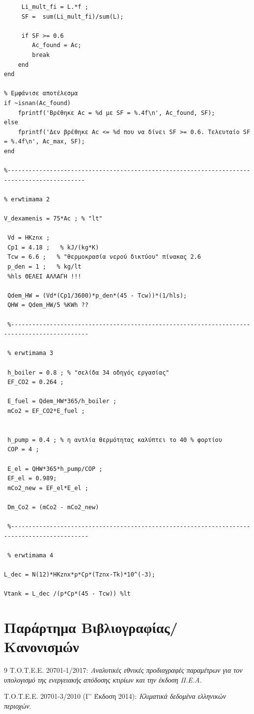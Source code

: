 \documentclass[10pt,a4paper]{article}
\begin{document}
\begin{lstlisting}
     Li_mult_fi = L.*f ;
     SF =  sum(Li_mult_fi)/sum(L);
     
     if SF >= 0.6
        Ac_found = Ac;
        break
    end
end

% Εμφάνισε αποτέλεσμα
if ~isnan(Ac_found)
    fprintf('Βρέθηκε Ac = %d με SF = %.4f\n', Ac_found, SF);
else
    fprintf('Δεν βρέθηκε Ac <= %d που να δίνει SF >= 0.6. Τελευταίο SF = %.4f\n', Ac_max, SF);
end

%--------------------------------------------------------------------------------------------

% erwtimama 2

V_dexamenis = 75*Ac ; % "lt"

 Vd = HKznx ;  
 Cp1 = 4.18 ;   % kJ/(kg*K)
 Tcw = 6.6 ;   % "θερμοκρασία νερού δικτύου" πίνακας 2.6
 p_den = 1 ;   % kg/lt
 %hls ΘΕΛΕΙ ΑΛΛΑΓΗ !!!
 
 Qdem_HW = (Vd*(Cp1/3600)*p_den*(45 - Tcw))*(1/hls); 
 QHW = Qdem_HW/5 %KWh ??

 %--------------------------------------------------------------------------------------------
  
 % erwtimama 3

 h_boiler = 0.8 ; % "σελίδα 34 οδηγός εργασίας"
 EF_CO2 = 0.264 ;
 
 E_fuel = Qdem_HW*365/h_boiler ;
 mCo2 = EF_CO2*E_fuel ;
 

 h_pump = 0.4 ; % η αντλία θερμότητας καλύπτει το 40 % φορτίου 
 COP = 4 ;

 E_el = QHW*365*h_pump/COP ;
 EF_el = 0.989; 
 mCo2_new = EF_el*E_el ;

 Dm_Co2 = (mCo2 - mCo2_new) 

 %--------------------------------------------------------------------------------------------
 
 % erwtimama 4
 
L_dec = N(12)*HKznx*p*Cp*(Tznx-Tk)*10^(-3);

Vtank = L_dec /(p*Cp*(45 - Tcw)) %lt
\end{lstlisting}

\section{Παράρτημα Βιβλιογραφίας/Κανονισμών}
\begin{thebibliography}{9}
Τ.Ο.Τ.Ε.Ε. 20701-1/2017: \emph{Αναλυτικές εθνικές προδιαγραφές παραμέτρων για τον υπολογισμό της ενεργειακής απόδοσης κτιρίων και την έκδοση Π.Ε.Α.} %

Τ.Ο.Τ.Ε.Ε. 20701-3/2010 (Γ' Έκδοση 2014): \emph{Κλιματικά δεδομένα ελληνικών περιοχών}. %
\end{thebibliography}
\end{document}
